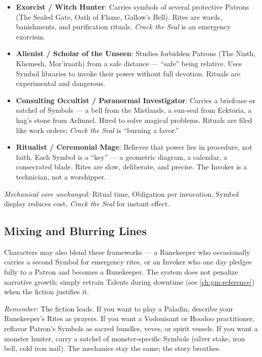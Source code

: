 \begin{itemize}
  \item \textbf{Exorcist / Witch Hunter}: Carries symbols of several protective Patrons (The Sealed Gate, Oath of Flame, Gallow's Bell). Rites are wards, banishments, and purification rituals. \emph{Crack the Seal} is an emergency exorcism.
  \item \textbf{Alienist / Scholar of the Unseen}: Studies forbidden Patrons (The Ninth, Khemesh, Mor'iraath) from a safe distance --- ``safe'' being relative. Uses Symbol libraries to invoke their power without full devotion. Rituals are experimental and dangerous.
  \item \textbf{Consulting Occultist / Paranormal Investigator}: Carries a briefcase or satchel of Symbols --- a bell from the Mistlands, a sun-seal from Ecktoria, a hag's stone from Aelinnel. Hired to solve magical problems. Rituals are filed like work orders; \emph{Crack the Seal} is ``burning a favor.''
  \item \textbf{Ritualist / Ceremonial Mage}: Believes that power lies in procedure, not faith. Each Symbol is a ``key'' --- a geometric diagram, a calendar, a consecrated blade. Rites are slow, deliberate, and precise. The Invoker is a technician, not a worshipper.
\end{itemize}

\noindent \textit{Mechanical core unchanged:} Ritual time, Obligation per invocation, Symbol display reduces cost, \emph{Crack the Seal} for instant effect.

\subsection*{Mixing and Blurring Lines}
Characters may also blend these frameworks --- a Runekeeper who occasionally carries a second Symbol for emergency rites, or an Invoker who one day pledges fully to a Patron and becomes a Runekeeper. The system does not penalize narrative growth; simply retrain Talents during downtime (see \ref{ch:gm-reference}) when the fiction justifies it.

\noindent \textit{Remember:} The fiction leads. If you want to play a Paladin, describe your Runekeeper's Rites as prayers. If you want a Vodouisant or Hoodoo practitioner, reflavor Patron's Symbols as sacred bundles, veves, or spirit vessels. If you want a monster hunter, carry a satchel of monster-specific Symbols (silver stake, iron bell, cold iron nail). The mechanics stay the same; the story breathes.


